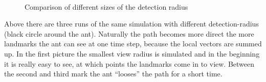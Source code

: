 \documentclass[11pt]{article}
\begin{document}
\begin{figure}[h!]
	\\
	\caption[Comparing growing detection radius]{Comparison of different sizes of the detection radius}
\end{figure}
Above there are three runs of the same simulation with different detection-radius (black circle around the ant). Naturally the path becomes more direct the more landmarks the ant can see at one time step, because the local vectors are summed up. In the first picture the smallest view radius is simulated and in the beginning it is really easy to see, at which points the landmarks come in to view. Between the second and third mark the ant “looses” the path for a short time.
\end{document}

